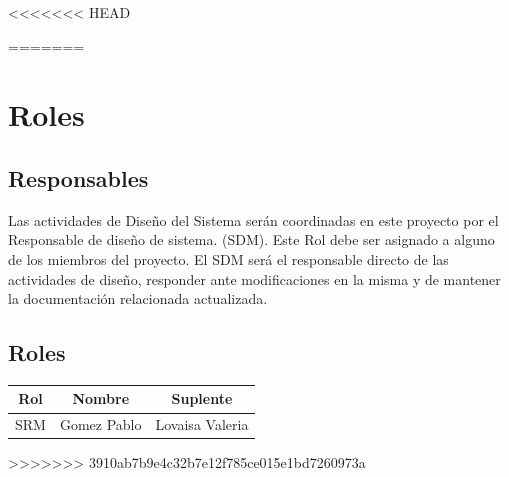 <<<<<<< HEAD



=======
\newpage
\section{\textcolor[gray]{.2}{Roles}}
\subsection{\textcolor[gray]{.2}{Responsables}}

Las actividades de Diseño del Sistema serán coordinadas en este proyecto por el Responsable de diseño de sistema. (SDM). Este Rol debe ser asignado a alguno de los miembros del proyecto.
El SDM será el responsable directo de las actividades de diseño, responder ante modificaciones en la misma  y de mantener la documentación relacionada actualizada.


\subsection{\textcolor[gray]{.2}{Roles}}
\begin{table}[!h]
\begin{center}
\begin{tabular}{|c|c|c|}
\hline
\rowcolor[gray]{.8} Rol & Nombre & Suplente\\
\hline
SRM & Gomez Pablo & Lovaisa Valeria\\
\hline
\end{tabular}
\end{center}
\end{table}
>>>>>>> 3910ab7b9e4c32b7e12f785ce015e1bd7260973a


